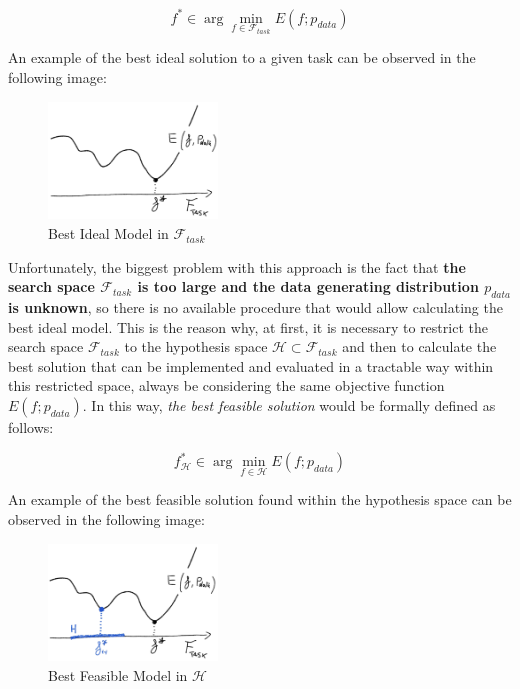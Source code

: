 \begin{equation*}
      f^* \in \arg \min_{f \in \mathcal{F}_{task}} E(f; p_{data})
\end{equation*}

An example of the best ideal solution to a given task can be observed in the following image:

\newpage

\begin{figure}[h]
      \centering
      \includegraphics[width=0.4\textwidth]{../img/Best_ideal_model}
      \caption{Best Ideal Model in $\mathcal{F}_{task}$}
\end{figure}

Unfortunately, the biggest problem with this approach is the fact that \textbf{the search
      space $\mathcal{F}_{task}$ is too large and the data generating distribution
      $p_{data}$ is unknown}, so there is no available procedure that would allow calculating
the best ideal model. This is the reason why, at first, it is necessary to
restrict the search space $\mathcal{F}_{task}$ to the hypothesis space
$\mathcal{H} \subset \mathcal{F}_{task}$ and then to calculate the best solution
that can be implemented and evaluated in a tractable way within this restricted space,
always be considering the same objective function $E(f; p_{data})$.
In this way, \emph{the best feasible solution} would be formally defined as follows:

\begin{equation*}
      f_{\mathcal{H}}^* \in \arg \min_{f \in \mathcal{H}} E(f; p_{data})
\end{equation*}

An example of the best feasible solution found within the hypothesis space can be observed
in the following image:

\begin{figure}[h]
      \centering
      \includegraphics[width=0.4\textwidth]{../img/Best_feasible_model}
      \caption{Best Feasible Model in $\mathcal{H}$}
\end{figure}

